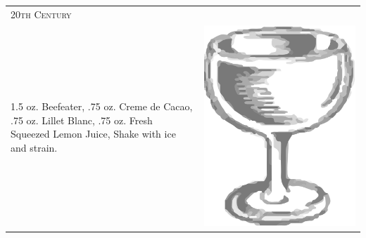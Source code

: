 \documentclass{article}
\begin{document}
\begin{tabular}{p{2in} p{0.5in}}
\multicolumn{2}{p{3in}}{\centering\Huge\textsc{20th Century}}\\ 
  \vspace{-0.1in} 1.5 oz. Beefeater, .75 oz. Creme de Cacao, .75 oz. Lillet Blanc, .75 oz. Fresh Squeezed Lemon Juice, Shake with ice and strain. &
  \vspace{-0.1in} \includegraphics{coupe.png}
\end{tabular}
\end{document}
